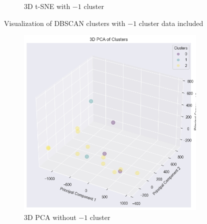 \begin{figure}[H]
\begin{subfigure}[b]{0.45\textwidth}
        \caption{3D t-SNE with $-1$ cluster}\label{fig:DBSCAN_tsne_with}
    \end{subfigure}
    \caption{Visualization of DBSCAN clusters with $-1$ cluster data included}\label{fig:with_outliers}
    \hspace*{\fill}
\end{figure}

\begin{figure}[H]
    \hspace*{\fill}
    \centering
    \begin{subfigure}[b]{0.45\textwidth}
        \centering
        \includegraphics[width=1.0\textwidth]{src/figs/3d_PCA_DBSCAN_without.png} 
        \caption{3D PCA without $-1$ cluster}\label{fig:DBSCAN_PCA_without}
    \end{subfigure}
    \hfill
    \begin{subfigure}[b]{0.45\textwidth}
        \centering

\end{subfigure}
\end{figure}
